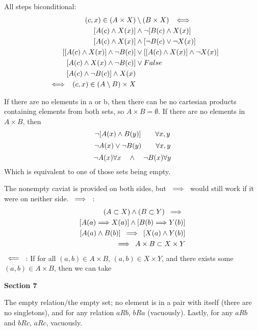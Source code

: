 \documentclass{article}
\DeclarePairedDelimiter\prn{(}{)}
\newcommand{\nl}[0]{\newline}
\newcommand{\rimp}[1][5]{\kern#1px \Longrightarrow \kern#1px}
\newcommand{\limp}[1][5]{\kern#1px \Longleftarrow \kern#1px}
\newcommand{\cimp}[1][5]{\kern#1px \iff \kern#1px}
\begin{document}
\begin{flushleft}
 \nl
All steps biconditional:
$$\begin{aligned}
(c, x) \in (A \times X) &\setminus (B \times X) \cimp \\
[A(c) \wedge X(x)] &\wedge \neg[B(c) \wedge X(x)]\\
[A(c) \wedge X(x)] &\wedge [\neg B(c) \vee \neg X(x)]\\
[[A(c) \wedge X(x)] \wedge \neg B(c)] &\vee [[A(c) \wedge X(x)] \wedge \neg X(x)] \\
[A(c) \wedge X(x) \wedge \neg B(c)] &\vee False \\
[A(c) \wedge \neg B(c)] \wedge X(x)\\
\cimp (c,x) \in (A \setminus B) \times X \\
\end{aligned}$$

 \nl
If there are no elements in a or b, then there can be no cartesian products containing elements from both sets, so $A \times B = \emptyset$. \nl
If there are no elements in $A \times B$, then
$$\neg[A(x) \wedge B(y)]\kern20px \forall x, y$$
$$\neg A(x) \vee \neg B(y)\kern20px \forall x,y$$
$$\neg A(x) \forall x \kern10px\wedge \kern10px \neg B(x) \forall y$$
Which is equivalent to one of those sets being empty. \nl

\fbox{$\prn*{A \subset X} \wedge \prn*{B \subset Y} \wedge \prn*{A \times B \neq \emptyset} \cimp (A \times B \subset X \times Y) \wedge (A \times B \neq \emptyset)$} \nl
The nonempty caviat is provided on both sides, but $\rimp$ would still work if it were on neither side. \nl
$\rimp$ :
$$\begin{aligned}
(A \subset X) \wedge (B \subset Y) \rimp \\
[A(a) \rimp[0] X(a)] \wedge [B(b) \rimp[0] Y(b)] \\
[A(a) \wedge B(b)] \rimp[5] [X(a) \wedge Y(b)] \\
\rimp A \times B \subset X \times Y \\
\end{aligned}$$
$\limp$ :
If for all $(a,b) \in A \times B$, $(a,b) \in X \times Y$, and there exists some $(a,b) \in A \times B$, then we can take 

\centerline{\textbf{Section 7}}

\hspace*{1cm} \nl
{} \nl
The empty relation/the empty set; no element is in a pair with itself (there are no singletons), and for any relation $aRb$, $bRa$ (vacuously). Lastly, for any $aRb$ and $bRc$, $aRc$, vacuously. \nl


\end{flushleft}
\end{document}
